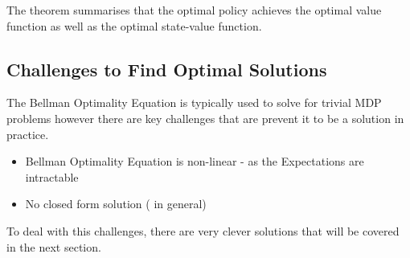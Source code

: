 \documentclass[ %
                    author={Ashwinder Khurana},
                supervisor={Prof Dave Cliff},
                    degree={MEng},
                     title={The Deeply Reinforced Trader},
                  subtitle={},
                      type={enterprise},
                      year={2020} ]{dissertation}
\begin{document}
{The theorem \cite{MDP-theorem RL Course by David Silver - Lecture 2: Markov Decision Process} summarises that the optimal policy achieves the optimal value function as well as the optimal state-value function. 

\subsection{Challenges to Find Optimal Solutions}
The Bellman Optimality Equation is typically used to solve for trivial MDP problems however there are key challenges that are prevent it to be a solution in practice. 

\begin{itemize}
\item Bellman Optimality Equation is non-linear - as the Expectations are intractable 
\item No closed form solution ( in general)
\end{itemize}

\noindent
To deal with this challenges, there are very clever solutions that will be covered in the next section.

}
\end{document}
